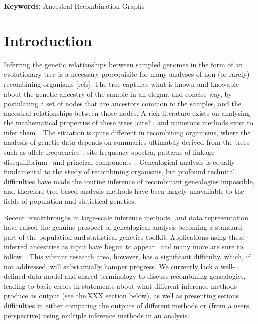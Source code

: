\documentclass{article}
\begin{document}
\textbf{Keywords:} Ancestral Recombination Graphs

\section*{Introduction}
Inferring the genetic relationships between sampled genomes in the form of an
evolutionary tree is a necessary prerequisite for many analyses of non (or
rarely) recombining organisms [refs]. The tree captures what is known and
knowable about the genetic ancestry of the sample in an elegant and concise
way, by postulating a set of nodes that are ancestors common to the samples,
and the ancestral relationships between those nodes. A rich literature exists
on analysing the mathematical properties of these trees [cite?], and numerous
methods exist to infer them~\citep{felsenstein2004inferring}. The situation is
quite different in recombining organisms, where the analysis of genetic data
depends on summaries ultimately derived from the trees such as allele
frequencies~\citep{ralph2020efficiently}, site frequency spectra, patterns of linkage
disequilibrium~\citep{mcvean2002genealogical} and principal
components~\citep{mcvean2009genealogical}. Genealogical analysis is equally
fundamental to the study of recombining organisms, but profound technical
difficulties have made the routine inference of recombinant genealogies
impossible, and therefore tree-based analysis methods have been largely
unavailable to the fields of population and statistical genetics.

Recent breakthroughs in large-scale inference
methods~\citep{rasmussen2014genome,kelleher2019inferring,speidel2019method,
schaefer2021ancestral,wohns2021unified}
and data representation~\citep{kelleher2016efficient}
have raised the genuine prospect of genealogical analysis becoming a standard part
of the population and statistical genetics toolkit.
Applications using these inferred ancestries as input have
begun to appear~\citep{osmond2021estimating} and many more are sure to
follow~\citep{harris2019database}. This vibrant research area, however,
has a significant difficulty, which, if not addressed, will substantially hamper
progress. We currently lack a well-defined data-model and shared terminology
to discuss recombining genealogies,
leading to basic errors in statements about what different inference methods
produce as output (see the XXX section below), as well as presenting serious
difficulties in either comparing the outputs of different methods or
(from a users perspective) using multiple inference methods in an analysis.
\end{document}
